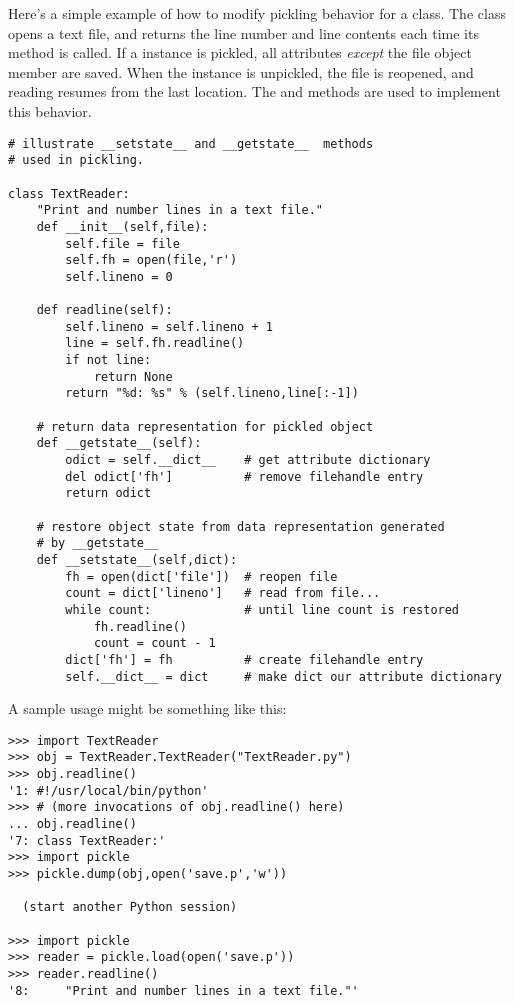 Here's a simple example of how to modify pickling behavior for a
class.  The  class opens a text file, and returns
the line number and line contents each time its 
method is called. If a  instance is pickled, all
attributes \emph{except} the file object member are saved. When the
instance is unpickled, the file is reopened, and reading resumes from
the last location. The  and
 methods are used to implement this behavior.

\begin{verbatim}
# illustrate __setstate__ and __getstate__  methods
# used in pickling.

class TextReader:
    "Print and number lines in a text file."
    def __init__(self,file):
        self.file = file
        self.fh = open(file,'r')
        self.lineno = 0

    def readline(self):
        self.lineno = self.lineno + 1
        line = self.fh.readline()
        if not line:
            return None
        return "%d: %s" % (self.lineno,line[:-1])

    # return data representation for pickled object
    def __getstate__(self):
        odict = self.__dict__    # get attribute dictionary
        del odict['fh']          # remove filehandle entry
        return odict

    # restore object state from data representation generated 
    # by __getstate__
    def __setstate__(self,dict):
        fh = open(dict['file'])  # reopen file
        count = dict['lineno']   # read from file...
        while count:             # until line count is restored
            fh.readline()
            count = count - 1
        dict['fh'] = fh          # create filehandle entry
        self.__dict__ = dict     # make dict our attribute dictionary
\end{verbatim}

A sample usage might be something like this:

\begin{verbatim}
>>> import TextReader
>>> obj = TextReader.TextReader("TextReader.py")
>>> obj.readline()
'1: #!/usr/local/bin/python'
>>> # (more invocations of obj.readline() here)
... obj.readline()
'7: class TextReader:'
>>> import pickle
>>> pickle.dump(obj,open('save.p','w'))

  (start another Python session)

>>> import pickle
>>> reader = pickle.load(open('save.p'))
>>> reader.readline()
'8:     "Print and number lines in a text file."'
\end{verbatim}


